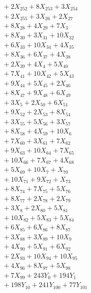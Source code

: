 \documentclass[a4paper,10pt]{article}
\begin{document}
{\begin{align}
&\quad  + 2X_{252} + 8X_{253} + 3X_{254} \\[0.5ex]
&\quad  + 2X_{255} + 3X_{26} + 2X_{27} \\[0.5ex]
&\quad  + 8X_{28} + 4X_{29} + 7X_{3} \\[0.5ex]
&\quad  + 8X_{30} + 3X_{31} + 10X_{32} \\[0.5ex]
&\quad  + 6X_{33} + 10X_{34} + 4X_{35} \\[0.5ex]
&\quad  + 8X_{36} + 6X_{37} + 4X_{38} \\[0.5ex]
&\quad  + 2X_{39} + 4X_{4} + 5X_{40} \\[0.5ex]
&\quad  + 7X_{41} + 10X_{42} + 5X_{43} \\[0.5ex]
&\quad  + 9X_{44} + 5X_{45} + 2X_{46} \\[0.5ex]
&\quad  + 8X_{47} + 9X_{48} + 6X_{49} \\[0.5ex]
&\quad  + 3X_{5} + 2X_{50} + 6X_{51} \\[0.5ex]
&\quad  + 9X_{52} + 2X_{53} + 8X_{54} \\[0.5ex]
&\quad  + 3X_{55} + 5X_{56} + 3X_{57} \\[0.5ex]
&\quad  + 8X_{58} + 4X_{59} + 10X_{6} \\[0.5ex]
&\quad  + 7X_{60} + 3X_{61} + 7X_{62} \\[0.5ex]
&\quad  + 9X_{63} + 10X_{64} + 7X_{65} \\[0.5ex]
&\quad  + 10X_{66} + 7X_{67} + 4X_{68} \\[0.5ex]
&\quad  + 5X_{69} + 10X_{7} + X_{70} \\[0.5ex]
&\quad  + 10X_{71} + 9X_{72} + X_{73} \\[0.5ex]
&\quad  + 8X_{74} + 7X_{75} + 5X_{76} \\[0.5ex]
&\quad  + 8X_{77} + 2X_{78} + 2X_{79} \\[0.5ex]
&\quad  + 3X_{8} + 2X_{80} + 5X_{81} \\[0.5ex]
&\quad  + 10X_{82} + 5X_{83} + 5X_{84} \\[0.5ex]
&\quad  + 6X_{85} + 6X_{86} + 8X_{87} \\[0.5ex]
&\quad  + 3X_{88} + 3X_{89} + 10X_{9} \\[0.5ex]
&\quad  + 4X_{90} + 5X_{91} + 6X_{92} \\[0.5ex]
&\quad  + 2X_{93} + 10X_{94} + 10X_{95} \\[0.5ex]
&\quad  + 4X_{96} + 8X_{97} + 5X_{98} \\[0.5ex]
&\quad  + 7X_{99} + 243Y_{0} + 194Y_{1} \\[0.5ex]
&\quad  + 198Y_{10} + 241Y_{100} + 77Y_{101} \\[0.5ex]

\end{align}}
\end{document}
